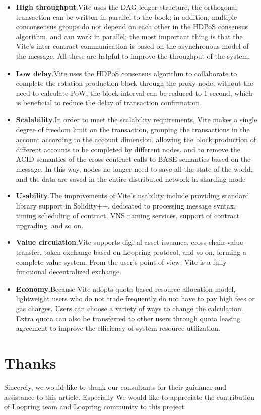 \documentclass[UTF8,nofonts]{article}
\begin{document}
\begin{multicols}{2}
\begin{itemize}
	\item \textbf{High throughput}.Vite uses the DAG ledger structure, the orthogonal transaction can be written in parallel to the book; in addition, multiple conconsensus groups do not depend on each other in the HDPoS consensus algorithm, and can work in parallel; the most important thing is that the Vite's inter contract communication is based on the asynchronous model of the message. All these are helpful to improve the throughput of the system.
	\item \textbf{Low delay}.Vite uses the HDPoS consensus algorithm to collaborate to complete the rotation production block through the proxy node, without the need to calculate PoW, the block interval can be reduced to 1 second, which is beneficial to reduce the delay of transaction confirmation.
	\item \textbf{Scalability}.In order to meet the scalability requirements, Vite makes a single degree of freedom limit on the transaction, grouping the transactions in the account according to the account dimension, allowing the block production of different accounts to be completed by different nodes, and to remove the ACID semantics of the cross contract calls to BASE semantics based on the message. In this way, nodes no longer need to save all the state of the world, and the data are saved in the entire distributed network in sharding mode
	\item \textbf{Usability}.The improvements of Vite's usability include providing standard library support in Solidity++, dedicated to processing message syntax, timing scheduling of contract, VNS naming services, support of contract upgrading, and so on.
	\item \textbf{Value circulation}.Vite supports digital asset issuance, cross chain value transfer, token exchange based on Loopring protocol, and so on, forming a complete value system. From the user's point of view, Vite is a fully functional decentralized exchange.
	\item \textbf{Economy}.Because Vite adopts quota based resource allocation model, lightweight users who do not trade frequently do not have to pay high fees or gas charges. Users can choose a variety of ways to change the calculation. Extra quota can also be transferred to other users through quota leasing agreement to improve the efficiency of system resource utilization.
\end{itemize}
\section{Thanks}
Sincerely, we would like to thank our consultants for their guidance and assistance to this article. Especially We would like to appreciate the contribution of Loopring team and Loopring community to this project. 

\end{multicols}
\end{document}
